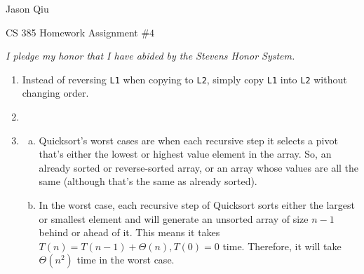 \documentclass[a4paper,10pt]{article}
\begin{document}
Jason Qiu

CS 385 Homework Assignment $\#4$

\emph{I pledge my honor that I have abided by the Stevens Honor System.}
\begin{enumerate}
\item Instead of reversing \verb|L1| when copying to \verb|L2|, simply copy \verb|L1| into \verb|L2| without changing order.

\item {}

\item \begin{enumerate}[(a)]
	\item Quicksort's worst cases are when each recursive step it selects a pivot that's either the lowest or highest value element in the array. So, an already sorted or reverse-sorted array, or an array whose values are all the same (although that's the same as already sorted).
	\item In the worst case, each recursive step of Quicksort sorts either the largest or smallest element and will generate an unsorted array of size $n-1$ behind or ahead of it. This means it takes $T(n) = T(n-1) + \Theta (n), T(0) = 0$ time. Therefore, it will take $\Theta(n^2)$ time in the worst case.


\end{enumerate}
\end{enumerate}
\end{document}

